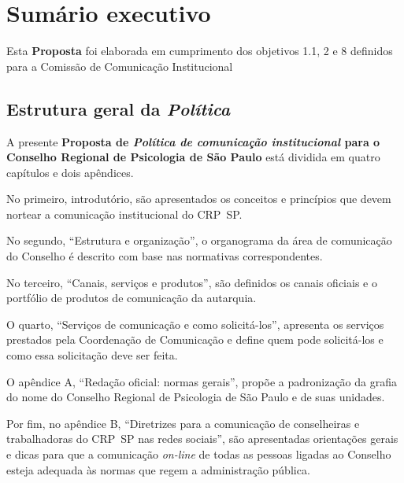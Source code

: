 \chapter*{Sumário executivo}

Esta \textbf{Proposta} foi elaborada em cumprimento dos objetivos 1.1, 2 e 8 definidos para a Comissão de Comunicação Institucional

\section*{Estrutura geral da \emph{Política}}

A presente \textbf{Proposta de \emph{Política de comunicação institucional} para o Conselho Regional de Psicologia de São Paulo} está dividida em quatro capítulos e dois apêndices.

No primeiro, introdutório, são apresentados os conceitos e princípios que devem nortear a comunicação institucional do CRP~SP.

No segundo, ``Estrutura e organização'', o organograma da área de comunicação do Conselho é descrito com base nas normativas correspondentes.

No terceiro, ``Canais, serviços e produtos'', são definidos os canais oficiais e o portfólio de produtos de comunicação da autarquia.

O quarto, ``Serviços de comunicação e como solicitá-los'', apresenta os serviços prestados pela Coordenação de Comunicação e define quem pode solicitá-los e como essa solicitação deve ser feita.

O apêndice A, ``Redação oficial: normas gerais'', propõe a padronização da grafia do nome do Conselho Regional de Psicologia de São Paulo e de suas unidades.

Por fim, no apêndice B, ``Diretrizes para a comunicação de conselheiras e trabalhadoras do CRP~SP nas redes sociais'', são apresentadas orientações gerais e dicas para que a comunicação \emph{on-line} de todas as pessoas ligadas ao Conselho esteja adequada às normas que regem a administração pública.